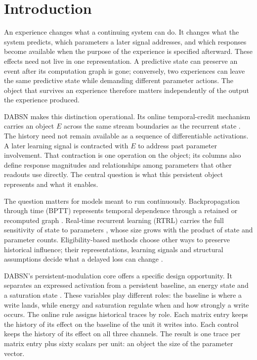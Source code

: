 \documentclass[11pt]{article}
\theoremstyle{definition}
\begin{document}
\section{Introduction}

An experience changes what a continuing system can do. It changes what the system
predicts, which parameters a later signal addresses, and which responses become
available when the purpose of the experience is specified afterward. These effects
need not live in one representation. A predictive state can preserve an event
after its computation graph is gone; conversely, two experiences can leave the
same predictive state while demanding different parameter actions. The object
that survives an experience therefore matters independently of the output the
experience produced.

DABSN makes this distinction operational. Its online temporal-credit mechanism
carries an object $E$ across the same stream boundaries as the recurrent state
\citep{rosdahl2026dabsn}. The history need not remain available as a sequence of
differentiable activations. A later learning signal is contracted with $E$ to
address past parameter involvement. That contraction is one operation on the
object; its columns also define response magnitudes and relationships among
parameters that other readouts use directly. The central question is what this
persistent object represents and what it enables.

The question matters for models meant to run continuously. Backpropagation through
time (BPTT) represents temporal dependence through a retained or recomputed graph
\citep{werbos1990bptt}. Real-time recurrent learning (RTRL) carries the full
sensitivity of state to parameters \citep{williams1989rtrl}, whose size grows
with the product of state and parameter counts. Eligibility-based methods choose
other ways to preserve historical influence; their representations, learning
signals and structural assumptions decide what a delayed loss can change
\citep{murray2019rflo,bellec2020eprop,bohnstingl2023ostl,marschall2020unified}.

DABSN's persistent-modulation core offers a specific design opportunity. It
separates an expressed activation from a persistent baseline, an energy state and
a saturation state \citep{rosdahl2026dabsn}. These variables play different roles:
the baseline is where a write lands, while energy and saturation regulate when and
how strongly a write occurs. The online rule assigns historical traces by role.
Each matrix entry keeps the history of its effect on the baseline of the unit it
writes into. Each control keeps the history of its effect on all three channels.
The result is one trace per matrix entry plus sixty scalars per unit: an object the
size of the parameter vector.
\end{document}
